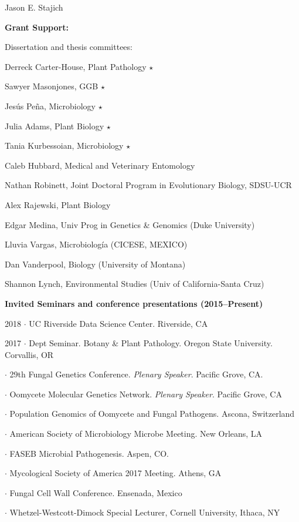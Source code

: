 \documentclass[10pt]{article}
\begin{document}
\begin{cv}{\centerline{Jason E. Stajich}}
\begin{cvlistcompact}{\bf Grant Support:}
\begin{cvlistcompact}{Dissertation and thesis committees:}
\item Derreck Carter-House, Plant Pathology $\star$
\item Sawyer Masonjones, GGB $\star$
\item Jes\'{u}s Pe\~{n}a, Microbiology $\star$
\item Julia Adams, Plant Biology $\star$
\item Tania Kurbessoian, Microbiology $\star$
\item Caleb Hubbard, Medical and Veterinary Entomology
\item Nathan Robinett, Joint Doctoral Program in Evolutionary Biology, SDSU-UCR
\item Alex Rajewski, Plant Biology
\item Edgar Medina, Univ Prog in Genetics \& Genomics (Duke University)
\item Lluvia Vargas, Microbiolog\'{i}a (CICESE, MEXICO)
\item Dan Vanderpool, Biology (University of Montana)
\item Shannon Lynch, Environmental Studies (Univ of California-Santa Cruz)
\end{cvlistcompact}

\end{cvlistcompact}

\setlength{\cvlabelwidth}{8mm}
\begin{cvlistcompact}{\bf Invited Seminars and conference presentations (2015--Present)}
\item [2018] $\cdot$ UC Riverside Data Science Center. Riverside, CA
\item [2017] $\cdot$ Dept Seminar. Botany \& Plant Pathology. Oregon State
  University. Corvallis, OR
\item $\cdot$
  29th Fungal Genetics Conference. \textit{Plenary Speaker}. Pacific Grove,
  CA.
\item $\cdot$ Oomycete Molecular Genetics Network. \textit{Plenary
     Speaker}. Pacific Grove, CA
\item $\cdot$ Population Genomics of Oomycete and Fungal
  Pathogens. Ascona, Switzerland
\item $\cdot$ American Society of Microbiology Microbe Meeting. New Orleans, LA
\item $\cdot$ FASEB Microbial Pathogenesis. Aspen, CO.
\item $\cdot$ Mycological Society of America 2017 Meeting. Athens, GA
\item $\cdot$ Fungal Cell Wall Conference. Ensenada, Mexico
\item $\cdot$ Whetzel-Westcott-Dimock Special Lecturer, Cornell University, Ithaca, NY


\end{cvlistcompact}
\end{cv}
\end{document}
